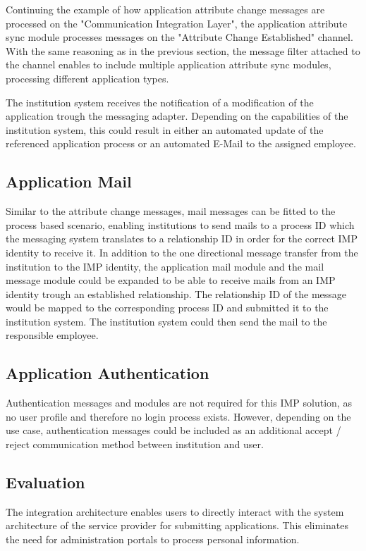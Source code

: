 Continuing the example of how application attribute change messages are processed on the "Communication Integration Layer", the application attribute sync module processes messages on the "Attribute Change Established" channel. With the same reasoning as in the previous section, the message filter attached to the channel enables to include multiple application attribute sync modules, processing different application types.

The institution system receives the notification of a modification of the application trough the messaging adapter. Depending on the capabilities of the institution system, this could result in either an automated update of the referenced application process or an automated E-Mail to the assigned employee.

\subsection{Application Mail}

Similar to the attribute change messages, mail messages can be fitted to the process based scenario, enabling institutions to send mails to a process ID which the messaging system translates to a relationship ID in order for the correct IMP identity to receive it. In addition to the one directional message transfer from the institution to the IMP identity, the application mail module and the mail message module could be expanded to be able to receive mails from an IMP identity trough an established relationship. The relationship ID of the message would be mapped to the corresponding process ID and submitted it to the institution system. The institution system could then send the mail to the responsible employee.

\subsection{Application Authentication}

Authentication messages and modules are not required for this IMP solution, as no user profile and therefore no login process exists. However, depending on the use case, authentication messages could be included as an additional accept / reject communication method between institution and user.

\subsection{Evaluation}
The integration architecture enables users to directly interact with the system architecture of the service provider for submitting applications. This eliminates the need for administration portals to process personal information.

